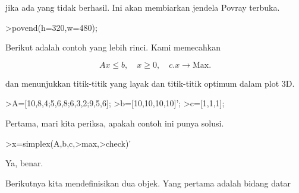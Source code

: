 \documentclass[a4paper,10pt]{article}
\begin{document}
\begin{eulernotebook}
\begin{eulercomment}
\begin{eulercomment}
\begin{eulercomment}
\begin{eulercomment}
\begin{eulercomment}
\begin{eulercomment}
\begin{eulercomment}
\begin{eulercomment}
\begin{eulercomment}
\begin{eulercomment}
\begin{eulercomment}
\begin{eulercomment}
\begin{eulercomment}
\begin{eulercomment}
\begin{eulercomment}
\begin{eulercomment}
\begin{eulercomment}
jika ada yang tidak berhasil. Ini akan membiarkan jendela Povray
terbuka.
\end{eulercomment}
\begin{eulerprompt}
>povend(h=320,w=480);
\end{eulerprompt}
\begin{eulercomment}
Berikut adalah contoh yang lebih rinci. Kami memecahkan

\end{eulercomment}
\begin{eulerformula}
\[
Ax \le b, \quad x \ge 0, \quad c.x \to \text{Max.}
\]
\end{eulerformula}
\begin{eulercomment}
dan menunjukkan titik-titik yang layak dan titik-titik optimum dalam
plot 3D.
\end{eulercomment}
\begin{eulerprompt}
>A=[10,8,4;5,6,8;6,3,2;9,5,6];
>b=[10,10,10,10]';
>c=[1,1,1];
\end{eulerprompt}
\begin{eulercomment}
Pertama, mari kita periksa, apakah contoh ini punya solusi.
\end{eulercomment}
\begin{eulerprompt}
>x=simplex(A,b,c,>max,>check)'
\end{eulerprompt}
\begin{euleroutput}
  [0,  1,  0.5]
\end{euleroutput}
\begin{eulercomment}
Ya, benar.

Berikutnya kita mendefinisikan dua objek. Yang pertama adalah bidang
datar


\end{eulercomment}
\end{eulercomment}
\end{eulercomment}
\end{eulercomment}
\end{eulercomment}
\end{eulercomment}
\end{eulercomment}
\end{eulercomment}
\end{eulercomment}
\end{eulercomment}
\end{eulercomment}
\end{eulercomment}
\end{eulercomment}
\end{eulercomment}
\end{eulercomment}
\end{eulercomment}
\end{eulercomment}
\end{eulernotebook}
\end{document}
